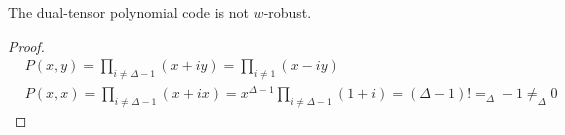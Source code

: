 \documentclass[manuscript,screen,review]{acmart}
\begin{document}
\begin{claim}
 \label{claim:nowr} The dual-tensor polynomial code is not $w$-robust. 
\end{claim}

\begin{proof}

  \begin{equation*}
    \begin{split}
     & P(x,y) = \prod_{i \neq \Delta - 1}{ \left( x + i y \right)  }=\prod_{i \neq  1}{ \left( x - i y \right)  } \\ 
     & P(x,x) = \prod_{i \neq \Delta - 1}{ \left( x + i x \right)  }= x^{\Delta-1}\prod_{i \neq \Delta - 1}{ \left( 1 + i \right) } = \left( \Delta-1 \right)!  =_{\Delta} -1  \neq_{\Delta} 0 
    \end{split}
  \end{equation*}
\end{proof}
\printbibliography 
\end{document}
